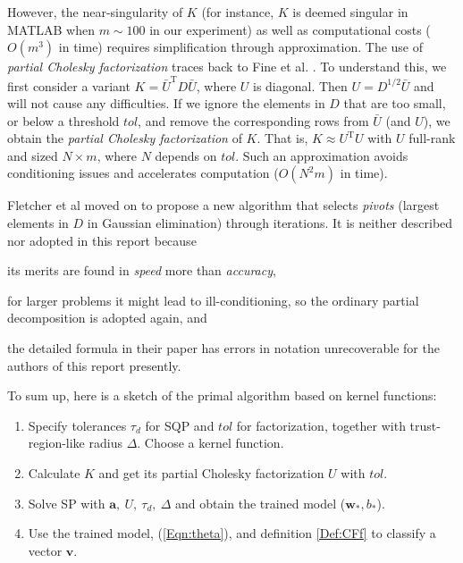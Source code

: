 \documentclass[11pt,a4paper]{article}
\theoremstyle{definition}
\renewcommand{\vec}[1]{\boldsymbol{#1}}
\begin{document}
      However, the near-singularity of $K$ (for instance, $K$ is deemed singular in \textsf{MATLAB} when $m\sim100$ in our experiment) as well as computational costs ($O(m^{3})$ in time) requires simplification through approximation. The use of \textit{partial Cholesky factorization} \cite{goldfarb2004product} traces back to Fine et al. \cite{fine2002efficient}. To understand this, we first consider a variant $K=\bar{U}^{\mathrm{T}}D\bar{U}$, where $U$ is diagonal. Then $U=D^{1/2}\bar{U}$ and will not cause any difficulties. If we ignore the elements in $D$ that are too small, or below a threshold $tol$, and remove the corresponding rows from $\bar{U}$ (and $U$), we obtain the \textit{partial Cholesky factorization} of $K$. That is, $K\approx U^{\mathrm{T}}U$ with $U$ full-rank and sized $N\times m$, where $N$ depends on $tol$. Such an approximation avoids conditioning issues and accelerates computation ($O(N^{2}m)$ in time).

      Fletcher et al \cite{fletcher2010binary} moved on to propose a new algorithm that selects \textit{pivots} (largest elements in $D$ in Gaussian elimination) through iterations. It is neither described nor adopted in this report because
      \begin{inparaenum}[a)]
        \item its merits are found in \emph{speed} more than \emph{accuracy},
        \item for larger problems it might lead to ill-conditioning, so the ordinary partial decomposition is adopted again, and
        \item the detailed formula in their paper has errors in notation unrecoverable for the authors of this report presently.
      \end{inparaenum}

      To sum up, here is a sketch of the primal algorithm based on kernel functions:
      \begin{enumerate}
        \item Specify tolerances $\tau_{d}$ for SQP and $tol$ for factorization, together with trust-region-like radius $\Delta$. Choose a kernel function.
        \item Calculate $K$ and get its partial Cholesky factorization $U$ with $tol$.
        \item Solve SP with $\vec{a},~U,~\tau_{d},~\Delta$ and obtain the trained model ($\vec{w}_{*},b_{*}$).
        \item Use the trained model, (\ref{Eqn:theta}), and definition \ref{Def:CFf} to classify a vector $\vec{v}$.
      \end{enumerate}
\end{document}

